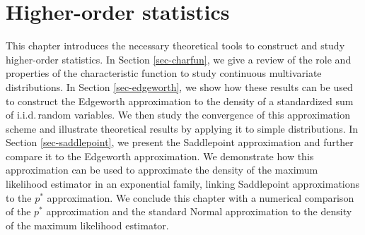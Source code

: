 \section{Higher-order statistics} \label{sec-ho-stats}

This chapter introduces the necessary theoretical tools to construct and study higher-order statistics. In Section \ref{sec-charfun}, we give a review of the role and properties of the characteristic function to study continuous multivariate distributions. In Section \ref{sec-edgeworth}, we show how these results can be used to construct the Edgeworth approximation to the density of a standardized sum of i.i.d.\,random variables. We then study the convergence of this approximation scheme and illustrate theoretical results by applying it to simple distributions. In Section \ref{sec-saddlepoint}, we present the Saddlepoint approximation and further compare it to the Edgeworth approximation. We demonstrate how this approximation can be used to approximate the density of the maximum likelihood estimator in an exponential family, linking Saddlepoint approximations to the $p^*$ approximation. We conclude this chapter with a numerical comparison of the $p^*$ approximation and the standard Normal approximation to the density of the maximum likelihood estimator.







